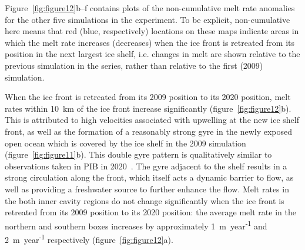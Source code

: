 \documentclass[draft]{agujournal2019}
\begin{document}
Figure~\ref{fig:figure12}b--f contains plots of the non-cumulative melt rate anomalies for the other five simulations in the experiment. To be explicit, non-cumulative here means that red (blue, respectively) locations on these maps indicate areas in which the melt rate increases (decreases) when the ice front is retreated from its position in the next largest ice shelf, i.e. changes in melt are shown relative to the previous simulation in the series, rather than relative to the first (2009) simulation.

When the ice front is retreated from its 2009 position to its 2020 position, melt rates within 10~km of the ice front increase significantly (figure~\ref{fig:figure12}b). This is attributed to high velocities associated with upwelling at the new ice shelf front, as well as the formation of a reasonably strong gyre in the newly exposed open ocean which is covered by the ice shelf in the 2009 simulation (figure~\ref{fig:figure11}b). This double gyre pattern is qualitatively similar to observations taken in PIB in 2020~\cite{Yoon2021}. The gyre adjacent to the shelf results in a strong circulation along the front, which itself acts a dynamic barrier to flow, as well as providing a freshwater source to further enhance the flow. Melt rates in the both inner cavity regions do not change significantly when the ice front is retreated from its 2009 position to its 2020 position: the average melt rate in the northern and southern boxes increases by approximately 1~m~year\textsuperscript{-1} and 2~m~year\textsuperscript{-1} respectively (figure~\ref{fig:figure12}a).
\end{document}
